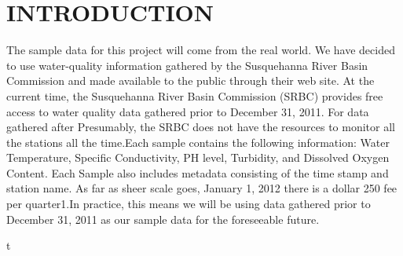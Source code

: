 \documentclass[a4paper]{article}
\begin{document}
\begin{minipage}[t]{0.45\textwidth}
\section*{INTRODUCTION}{\normalsize The sample data for this project will come from the real world. We have decided to use water-quality information gathered by the Susquehanna River Basin Commission and made available to the public through their web site. At the current time, the Susquehanna River Basin Commission (SRBC) provides free access to water quality data gathered prior to December 31, 2011. For data gathered after Presumably, the SRBC does not have the resources to monitor all the stations all the time.Each sample contains the following information: Water Temperature, Specific Conductivity, PH level, Turbidity, and Dissolved Oxygen Content. Each Sample also includes metadata consisting of the time stamp and station name. As far as sheer scale goes, January 1, 2012 there is a  dollar 250 fee per quarter1.In practice, this means we will be using data gathered prior to December 31, 2011 as our sample data for the foreseeable future.}
\renewcommand\footnoterule{\rule{\linewidth}{0.5pt}}
\end{minipage}t
\hspace{.5cm}
\end{document}
